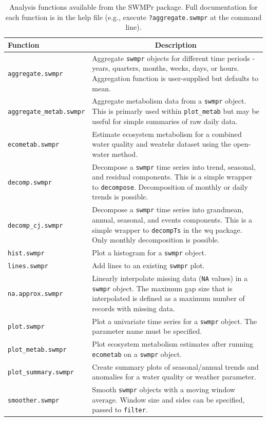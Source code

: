 \documentclass[10pt,letterpaper]{article}\usepackage[]{graphicx}\usepackage[]{color}
\begin{document}
\begin{table}[!tbp]
\caption{Analysis functions available from the SWMPr package.  Full documentation for each function is in the help file (e.g., execute \texttt{?aggregate.swmpr} at the command line).\label{tab:analyze}} 
\begin{center}
\begin{tabular}{lp{3.5in}}
\hline\hline
\multicolumn{1}{l}{Function}&\multicolumn{1}{c}{Description}\tabularnewline
\hline
\texttt{aggregate.swmpr}&Aggregate \texttt{swmpr} objects for different time periods - years, quarters, months,  weeks, days, or hours.  Aggregation function is user-supplied but defaults to mean.\tabularnewline
\texttt{aggregate\_metab.swmpr}&Aggregate metabolism data from a \texttt{swmpr} object.  This is primarly used within \texttt{plot\_metab} but may be useful for simple summaries of raw daily data.\tabularnewline
\texttt{ecometab.swmpr}&Estimate ecosystem metabolism for a combined water quality and weatehr dataset using the open-water method.\tabularnewline
\texttt{decomp.swmpr}&Decompose a \texttt{swmpr} time series into trend, seasonal, and residual components.  This is a simple wrapper to \texttt{decompose}.  Decomposition of monthly or daily trends is possible.\tabularnewline
\texttt{decomp\_cj.swmpr}&Decompose a \texttt{swmpr} time series into grandmean, annual, seasonal, and events components.  This is a simple wrapper to \texttt{decompTs} in the wq package.  Only monthly decomposition is possible.\tabularnewline
\texttt{hist.swmpr}&Plot a histogram for a \texttt{swmpr} object.\tabularnewline
\texttt{lines.swmpr}&Add lines to an existing \texttt{swmpr} plot.\tabularnewline
\texttt{na.approx.swmpr}&Linearly interpolate missing data (\texttt{NA} values) in a \texttt{swmpr} object. The maximum gap size that is interpolated is defined as a maximum number of records with missing data.\tabularnewline
\texttt{plot.swmpr}&Plot a univariate  time series for a \texttt{swmpr} object.  The parameter name must be specified.\tabularnewline
\texttt{plot\_metab.swmpr}&Plot ecosystem metabolism estimates after running \texttt{ecometab} on a \texttt{swmpr} object.\tabularnewline
\texttt{plot\_summary.swmpr}&Create summary plots of seasonal/annual trends and anomalies for a water quality or weather parameter.\tabularnewline
\texttt{smoother.swmpr}&Smooth \texttt{swmpr} objects with a moving window average.  Window size and sides can be specified, passed to \texttt{filter}.\tabularnewline
\hline
\end{tabular}\end{center}

\end{table}
\end{document}
